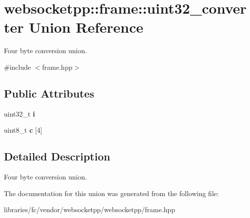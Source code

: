 \hypertarget{unionwebsocketpp_1_1frame_1_1uint32__converter}{}\section{websocketpp\+:\+:frame\+:\+:uint32\+\_\+converter Union Reference}
\label{unionwebsocketpp_1_1frame_1_1uint32__converter}


Four byte conversion union.  




{\ttfamily \#include $<$frame.\+hpp$>$}

\subsection*{Public Attributes}
\begin{DoxyCompactItemize}
\item 
\mbox{\label{unionwebsocketpp_1_1frame_1_1uint32__converter_a2bceb785be148d7c9b9ce11240595440}} 
uint32\+\_\+t {\bfseries i}
\item 
\mbox{\label{unionwebsocketpp_1_1frame_1_1uint32__converter_ad7e9db5dd4002d78e9aaf624d39fd69c}} 
uint8\+\_\+t {\bfseries c} \mbox{[}4\mbox{]}
\end{DoxyCompactItemize}


\subsection{Detailed Description}
Four byte conversion union. 

The documentation for this union was generated from the following file\+:\begin{DoxyCompactItemize}
\item 
libraries/fc/vendor/websocketpp/websocketpp/frame.\+hpp\end{DoxyCompactItemize}
